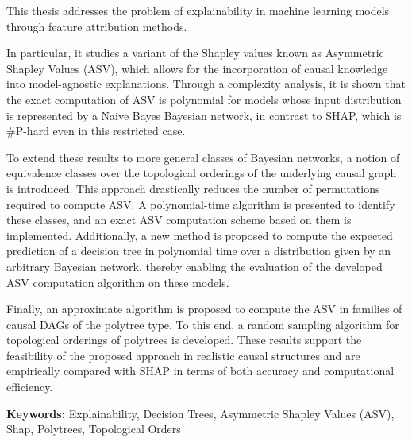 \noindent This thesis addresses the problem of explainability in machine learning models through feature attribution methods.

In particular, it studies a variant of the Shapley values known as Asymmetric Shapley Values (ASV), which allows for the incorporation of causal knowledge into model-agnostic explanations. Through a complexity analysis, it is shown that the exact computation of ASV is polynomial for models whose input distribution is represented by a Naive Bayes Bayesian network, in contrast to SHAP, which is \#P-hard even in this restricted case.

To extend these results to more general classes of Bayesian networks, a notion of equivalence classes over the topological orderings of the underlying causal graph is introduced. This approach drastically reduces the number of permutations required to compute ASV. A polynomial-time algorithm is presented to identify these classes, and an exact ASV computation scheme based on them is implemented. Additionally, a new method is proposed to compute the expected prediction of a decision tree in polynomial time over a distribution given by an arbitrary Bayesian network, thereby enabling the evaluation of the developed ASV computation algorithm on these models.

Finally, an approximate algorithm is proposed to compute the ASV in families of causal DAGs of the polytree type. To this end, a random sampling algorithm for topological orderings of polytrees is developed. These results support the feasibility of the proposed approach in realistic causal structures and are empirically compared with SHAP in terms of both accuracy and computational efficiency.
\bigskip

\noindent\textbf{Keywords:} Explainability, Decision Trees, Asymmetric Shapley Values (ASV), Shap, Polytrees, Topological Orders
